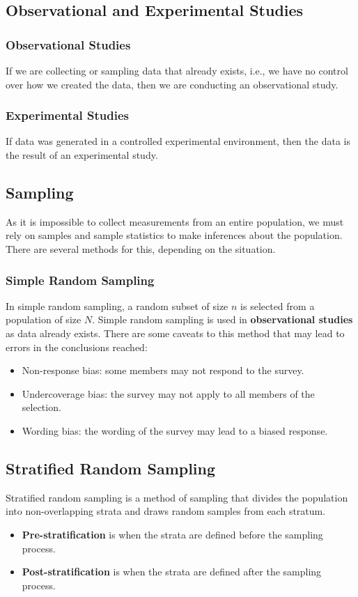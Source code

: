 \documentclass{article}
\begin{document}
\subsection{Observational and Experimental Studies}
\subsubsection{Observational Studies}
If we are collecting or sampling data that already exists, i.e., we
have no control over how we created the data, then we are conducting an
observational study.
\subsubsection{Experimental Studies}
If data was generated in a controlled experimental environment, then
the data is the result of an experimental study.
\subsection{Sampling}
As it is impossible to collect measurements from an entire population,
we must rely on samples and sample statistics to make inferences about
the population. There are several methods for this, depending on the
situation.
\subsubsection{Simple Random Sampling}
In simple random sampling, a random subset of size \(n\) is selected
from a population of size \(N\). Simple random sampling is used in
\textbf{observational studies} as data already exists. There are some
caveats to this method that may lead to errors in the conclusions
reached:
\begin{itemize}
    \item Non-response bias: some members may not respond to the
          survey.
    \item Undercoverage bias: the survey may not apply to all members
          of the selection.
    \item Wording bias: the wording of the survey may lead to a biased
          response.
\end{itemize}
\subsection{Stratified Random Sampling}
Stratified random sampling is a method of sampling that divides the
population into non-overlapping strata and draws random samples from
each stratum.
\begin{itemize}
    \item \textbf{Pre-stratification} is when the strata are defined before the sampling process.
    \item \textbf{Post-stratification} is when the strata are defined after the sampling process.
\end{itemize}
\end{document}
